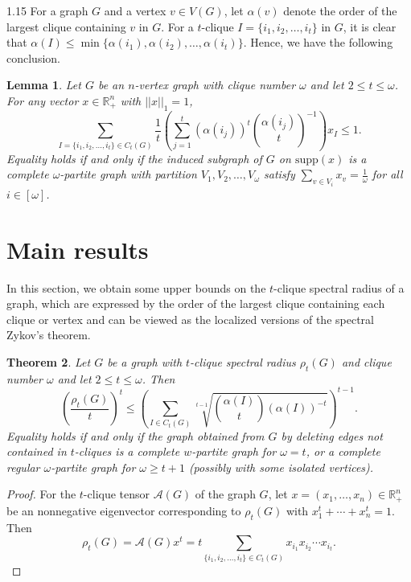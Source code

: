 \documentclass[preprint,12pt]{elsarticle1}
\newtheorem{thm}{Theorem}[section]
\newtheorem{lem}[thm]{Lemma}
\numberwithin{equation}{section}
\begin{document}
\begin{spacing}{1.15}
For a graph $G$ and a vertex $v\in V(G)$, let $\alpha(v)$ denote the order of the largest clique containing $v$ in $G$.
For a $t$-clique $I=\{i_1,i_2,\ldots,i_t\}$ in $G$, it is clear that $\alpha(I)\le\min\{\alpha(i_1),\alpha(i_2),\ldots,\alpha(i_t)\}$. Hence, we have the following conclusion.

\begin{lem}\label{w2}
Let $G$ be an $n$-vertex graph with clique number $\omega$ and let $2\le t\le\omega$. For any vector $x\in\mathbb{R}^{n}_{+}$ with $||x||_1=1$,
$$\sum_{I=\{i_1,i_2,\ldots,i_t\}\in C_t(G)} \frac{1}{t} \left(\sum_{j=1}^{t}\left(\alpha(i_j)\right)^t\binom{\alpha(i_j)}{t}^{-1}\right)x_I\le 1.$$
Equality holds if and only if the induced subgraph of $G$ on $\mathrm{supp}(x)$ is a complete $\omega$-partite graph with partition $V_1, V_2, \ldots, V_{\omega}$ satisfy $\sum_{v\in V_i}x_v=\frac{1}{\omega}$ for all $i\in[\omega]$.
\end{lem}
   


\section{Main results}
In this section, we obtain some upper bounds on the $t$-clique spectral radius of a graph, which are expressed by the order of the largest clique containing each clique or vertex and can be viewed as the localized versions of the spectral Zykov's theorem.

\begin{thm}\label{3}
Let $G$ be a graph with $t$-clique spectral radius $\rho_{t}(G)$ and clique number $\omega$ and let $2\le t\le \omega$. Then
$$\left( \frac{\rho_{t}(G)}{t} \right)^{t}\le \left( \sum_{I\in C_t(G)}\sqrt[t-1]{\binom{\alpha(I)}{t}\left(\alpha(I)\right)^{-t}} \right)^{t-1}.$$
Equality holds if and only if the graph obtained from $G$ by deleting edges not contained in $t$-cliques is a complete $w$-partite graph for $\omega=t$, or a complete regular $\omega$-partite graph for $\omega\ge t+1$ (possibly with some isolated vertices).
\end{thm}

\begin{proof}
For the $t$-clique tensor $\mathcal{A}(G)$ of the graph $G$, let $x=(x_1,\ldots,x_n)\in\mathbb{R}^{n}_{+}$ be an nonnegative eigenvector corresponding to $\rho_t(G)$ with $x_1^t+\cdots+x_n^t=1$. Then $$\rho_{t}(G)=\mathcal{A}(G)x^t=t\sum_{\{i_1,i_2,\ldots,i_t\}\in C_t(G)}x_{i_1} x_{i_2} \cdots x_{i_t}.$$


\end{proof}
\end{spacing}
\end{document}
